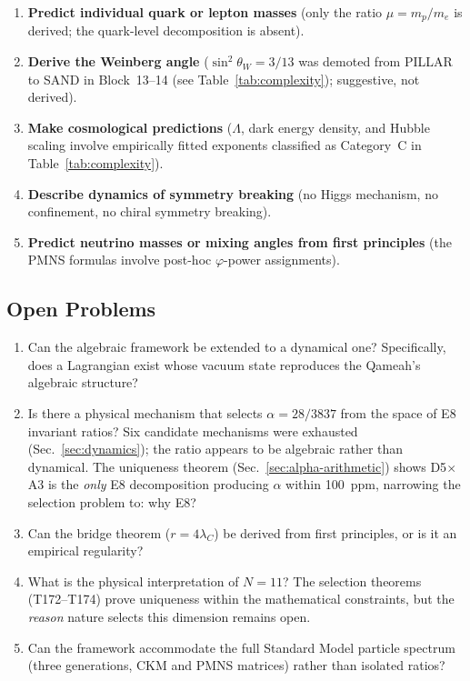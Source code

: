 \documentclass[aps,prd,twocolumn,superscriptaddress,floatfix,nofootinbib]{revtex4-2}
\theoremstyle{definition}
\theoremstyle{remark}
\newcommand{\vp}{\varphi}
\begin{document}
\begin{enumerate}
\item \textbf{Predict individual quark or lepton masses} (only the
      ratio $\mu = m_p/m_e$ is derived; the quark-level decomposition
      is absent).
\item \textbf{Derive the Weinberg angle} ($\sin^2\theta_W = 3/13$ was
      demoted from PILLAR to SAND in Block~13--14 (see Table~\ref{tab:complexity});
      suggestive, not derived).
\item \textbf{Make cosmological predictions} ($\Lambda$, dark energy
      density, and Hubble scaling involve empirically fitted exponents
      classified as Category~C in Table~\ref{tab:complexity}).
\item \textbf{Describe dynamics of symmetry breaking} (no Higgs
      mechanism, no confinement, no chiral symmetry breaking).
\item \textbf{Predict neutrino masses or mixing angles from first
      principles} (the PMNS formulas involve post-hoc $\vp$-power
      assignments).
\end{enumerate}

\subsection{Open Problems}

\begin{enumerate}
\item Can the algebraic framework be extended to a dynamical one?
      Specifically, does a Lagrangian exist whose vacuum state
      reproduces the Qameah's algebraic structure?

\item Is there a physical mechanism that selects
      $\alpha = 28/3837$ from the space of E8 invariant ratios?
      Six candidate mechanisms were exhausted
      (Sec.~\ref{sec:dynamics}); the ratio appears to be
      algebraic rather than dynamical.  The uniqueness theorem
      (Sec.~\ref{sec:alpha-arithmetic}) shows D5$\times$A3 is the
      \emph{only} E8 decomposition producing $\alpha$ within 100~ppm,
      narrowing the selection problem to: why E8?

\item Can the bridge theorem ($r = 4\lambda_C$) be derived from
      first principles, or is it an empirical regularity?

\item What is the physical interpretation of $N{=}11$?  The
      selection theorems (T172--T174) prove uniqueness within the
      mathematical constraints, but the \emph{reason} nature selects
      this dimension remains open.

\item Can the framework accommodate the full Standard Model particle
      spectrum (three generations, CKM and PMNS matrices) rather than
      isolated ratios?
\end{enumerate}
\end{document}
